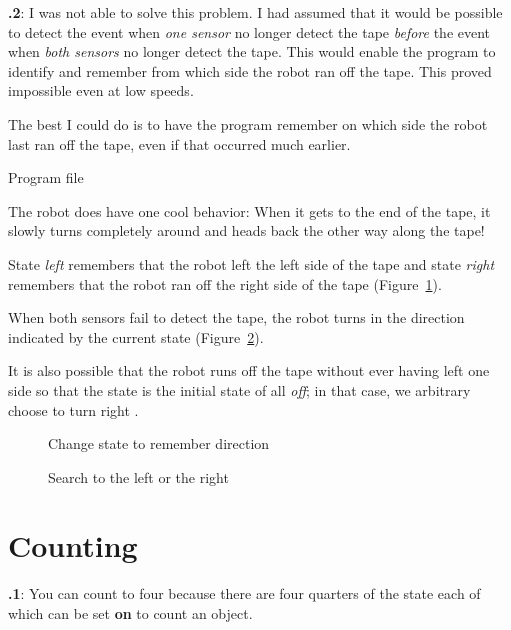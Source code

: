 \documentclass[12pt,a4paper,english]{article}
\begin{document}
\textbf{\thesection.2}:
I was not able to solve this problem. I had assumed that it would be
possible to detect the event when \emph{one sensor} no longer detect the
tape \emph{before} the event when \emph{both sensors} no longer detect
the tape. This would enable the program to identify and remember from
which side the robot ran off the tape. This proved impossible even at
low speeds.

The best I could do is to have the program remember on which side the
robot last ran off the tape, even if that occurred much earlier.

{\raggedleft \hfill Program file }

The robot does have one cool behavior: When it gets to the end of the
tape, it slowly turns completely around and heads back the other way
along the tape!

State \emph{left}  remembers that the robot left the
left side of the tape and state \emph{right} 
remembers that the robot ran off the right side of the tape
(Figure~\ref{fig.follow3}).

When both sensors fail to detect the tape, the robot turns in the
direction indicated by the current state (Figure~\ref{fig.follow1}).

It is also possible that the robot runs off the tape without ever having
left one side so that the state is the initial state of all \emph{off};
in that case, we arbitrary choose to turn right .

\begin{figure}
\begin{center}
\caption{Change state to remember direction}\label{fig.follow3}
\end{center}
\end{figure}

\begin{figure}
\begin{center}
\caption{Search to the left or the right}\label{fig.follow1}
\end{center}
\end{figure}

\section{Counting}

\textbf{\thesection.1}:
You can count to four because there are four quarters of the state
each of which can be set \textbf{on} to count an object.
\end{document}
